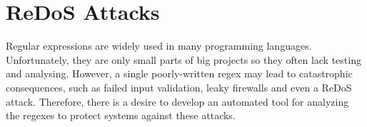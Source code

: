 \documentclass[acmsmall,screen]{acmart}
\begin{document}
%
%


\section{ReDoS Attacks}\label{sec:redos}
Regular expressions are widely used in many programming languages.
%
Unfortunately, they are only small parts of big projects so they often lack testing and analysing.
%
However, a single poorly-written regex may lead to catastrophic consequences, such as failed input validation, leaky firewalls and 
%
even a ReDoS attack.
% 
Therefore, there is a desire to develop an automated tool for analyzing the regexes to protect systems against these attacks.
%
\end{document}
